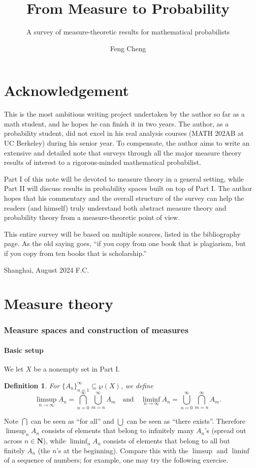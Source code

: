 \documentclass[10pt]{article}
\title{From Measure to Probability}
\subtitle{A survey of measure-theoretic results for mathematical probabilists}
\author{Feng Cheng}
\date{}
\numberwithin{equation}{section}
\theoremstyle{plain-star}
\theoremstyle{definition-star}
\newtheorem{defn}[equation]{Definition}
\theoremstyle{remark-star}
\theoremstyle{plain-star}
\newcommand{\N}{\mathbf{N}}
\begin{document}
\maketitle

\tableofcontents
\newpage
\part*{\Large Acknowledgement}

This is the most ambitious writing project undertaken by the author so far as a math student, and he hopes he can finish it in two years. The author, as a probability student, did not excel in his real analysis courses (MATH 202AB at UC Berkeley) during his senior year. To compensate, the author aims to write an extensive and detailed note that surveys through all the major measure theory results of interest to a rigorous-minded mathematical probabilist.

Part I of this note will be devoted to measure theory in a general setting, while Part II will discuss results in probability spaces built on top of Part I. The author hopes that his commentary and the overall structure of the survey can help the readers (and himself) truly understand both abstract measure theory and probability theory from a measure-theoretic point of view.

This entire survey will be based on multiple sources, listed in the bibliography page. As the old saying goes, ``if you copy from one book that is plagiarism, but if you copy from ten books that is scholarship.''
\vspace{1\baselineskip}

\noindent Shanghai, August 2024 \hfill F.C.
\newpage

\part{Measure theory}
\section{Measure spaces and construction of measures}
\subsection{Basic setup}
We let $X$ be a nonempty set in Part I.
\begin{defn}
    For $\{A_n\}_{n=1}^\infty\subseteq \wp(X)$, we define \[
        \limsup_{n \to \infty} A_n = \bigcap_{n=0}^\infty \bigcup_{m=n}^\infty A_m \quad \text{and}\quad \liminf_{n \to \infty} A_n = \bigcup_{n = 0}^\infty \bigcap_{m = n}^\infty A_m.
    \]
\end{defn}
Note $\bigcap$ can be seen as ``for all'' and $\bigcup$ can be seen as ``there exists''. Therefore $\limsup_n A_n$ consists of elements that belong to infinitely many $A_n$'s (spread out across $n \in \N$), while $\liminf_n A_n$ consists of elements that belong to all but finitely $A_n$ (the $n$'s at the beginning). Compare this with the $\limsup$ and $\liminf$ of a sequence of numbers; for example, one may try the following exercise.
\end{document}
